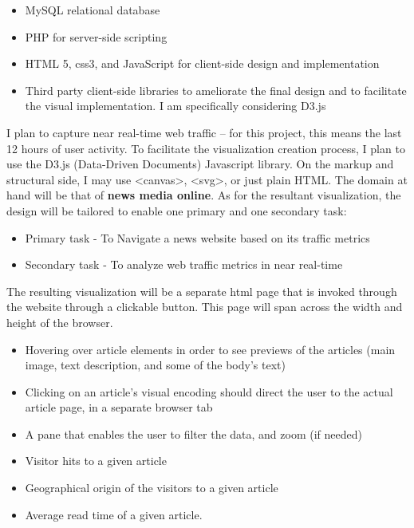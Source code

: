 \documentclass[12pt]{article}
\begin{document}
\begin{itemize}
\item MySQL relational database
\item PHP for server-side scripting
\item HTML 5, css3, and JavaScript for client-side design and implementation
\item Third party client-side libraries to ameliorate the final design and to facilitate the visual implementation. I am specifically considering D3.js
\end{itemize}

I plan to capture near real-time web traffic – for this project, this means the last 12 hours of user activity. To facilitate the visualization creation process, I plan to use the D3.js (Data-Driven Documents) Javascript library. On the markup and structural side, I may use <canvas>, <svg>, or just plain HTML. The domain at hand will be that of \textbf{news media online}. As for the resultant visualization, the design will be tailored to enable one primary and one secondary task:
\begin{itemize}
\item Primary task - To Navigate a news website based on its traffic metrics
\item Secondary task - To analyze web traffic metrics in near real-time
\end{itemize}

The resulting visualization will be a separate html page that is invoked through the website through a clickable button. This page will span across the width and height of the browser.

\begin{itemize}
\item Hovering over article elements in order to see previews of the articles (main image, text description, and some of the body’s text)
\item Clicking on an article’s visual encoding should direct the user to the actual article page, in a separate browser tab
\item A pane that enables the user to filter the data, and zoom (if needed)
\end{itemize}

\begin{itemize}
\item Visitor hits to a given article
\item Geographical origin of the visitors to a given article
\item Average read time of a given article.
\end{itemize}
\end{document}
